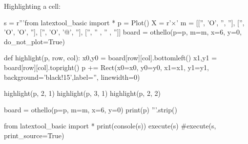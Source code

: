 \newpage
Highlighting a cell:

\begin{python}
s = r'''from latextool_basic import *
p = Plot()
X = r'$\times$'
m = [['', 'O', '',  ''],
     ['', 'O', 'O', ''],
     ['', 'O', '@', ''],
     ['', '' , '' , '']]
board = othello(p=p, m=m, x=6, y=0, do_not_plot=True)

def highlight(p, row, col):
    x0,y0 = board[row][col].bottomleft()
    x1,y1 = board[row][col].topright()
    p += Rect(x0=x0, y0=y0, x1=x1, y1=y1,
         background='black!15',label='', linewidth=0)

highlight(p, 2, 1)
highlight(p, 3, 1)
highlight(p, 2, 2)

board = othello(p=p, m=m, x=6, y=0)
print(p)
'''.strip()

from latextool_basic import *
print(console(s))
execute(s)
#execute(s, print_source=True)
\end{python}
